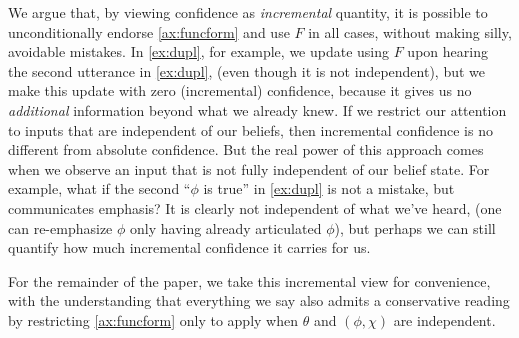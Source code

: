 \begin{subappendices}
    We argue that, by viewing confidence as \emph{incremental} 
    quantity, it is possible to  
    	unconditionally endorse \cref{ax:funcform}
    	and use $F$ in all cases, without making silly, avoidable mistakes.
    In \cref{ex:dupl}, for example, we update using $F$ 
    	upon hearing the second utterance in \cref{ex:dupl},
    	(even though it is not independent),
    	but we make this update with zero (incremental) confidence,
    	because it gives us no \emph{additional} information beyond
    	what we already knew. 
    If we restrict our attention to inputs that are independent of our beliefs, then
    incremental confidence is no different from absolute confidence.
    But the real power of this approach comes when we observe an input
    	that is not fully independent of our belief state. 
    For example, what if the second ``$\phi$ is true'' in \cref{ex:dupl}
    	is not a mistake, but communicates emphasis? 
    It is clearly not independent of what we've heard, 
    	(one can re-emphasize $\phi$ only having already articulated $\phi$),
    	but perhaps we can still
    	quantify how much incremental confidence it carries for us.

    For the remainder of the paper, we take this incremental view 
    for convenience, with the understanding that everything we say also 
    admits a conservative reading by restricting \cref{ax:funcform} 
    only to apply when $\theta$ and $(\phi,\chi)$ are independent.
    	




\end{subappendices}

